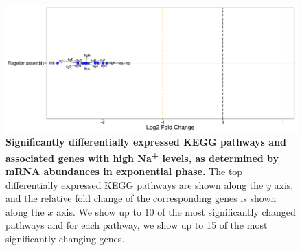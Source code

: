 \documentclass[a4paper]{article}
\begin{document}
\clearpage
\begin{figure}
	\includegraphics[width=1.0\textwidth]{../../d_figures/kegg_13.pdf}
	\caption[Significantly differentially expressed KEGG pathways for mRNA samples in exponential phase tested for high Na\textsuperscript{+} against base Na\textsuperscript{+}]
	{\textbf{Significantly differentially expressed KEGG pathways and associated genes with high Na\textsuperscript{+} levels, as determined by mRNA abundances in exponential phase.} The top differentially expressed KEGG pathways are shown along the $y$ axis, and the relative fold change of the corresponding genes is shown along the $x$ axis. We show up to 10 of the most significantly changed pathways and for each pathway, we show up to 15 of the most significantly changing genes.}
\end{figure}
\end{document}
